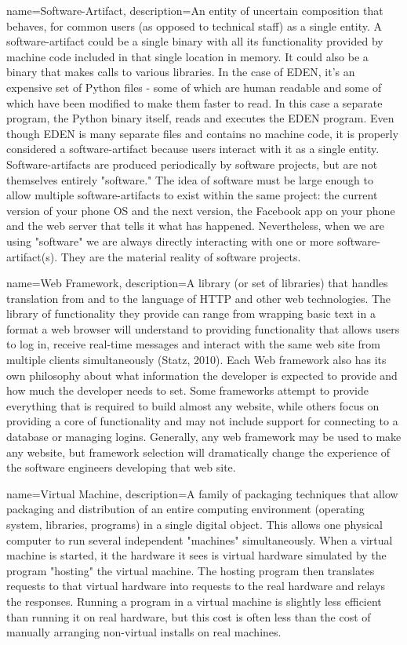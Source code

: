 {
    name=Software-Artifact,
    description={An entity of uncertain composition that behaves, for common users (as opposed to technical staff) as a single entity. A software-artifact could be a single binary with all its functionality provided by machine code included in that single location in memory. It could also be a binary that makes calls to various libraries. In the case of EDEN, it's an expensive set of Python files - some of which are human readable and some of which have been modified to make them faster to read. In this case a separate program, the Python binary itself, reads and executes the EDEN program. Even though EDEN is many separate files and contains no machine code, it is properly considered a software-artifact because users interact with it as a single entity.  Software-artifacts are produced periodically by software projects, but are not themselves entirely "software." The idea of software must be large enough to allow multiple software-artifacts to exist within the same project: the current version of your phone OS and the next version, the Facebook app on your phone and the web server that tells it what has happened. Nevertheless, when we are using "software" we are always directly interacting with one or more software-artifact(s). They are the material reality of software projects.}
}

{
  name=Web Framework,
  description={A library (or set of libraries) that handles translation from and to the language of HTTP and other web technologies. The library of functionality they provide can range from wrapping basic text in a format a web browser will understand to providing functionality that allows users to log in, receive real-time messages and interact with the same web site from multiple clients simultaneously (Statz, 2010). Each Web framework also has its own philosophy about what information the developer is expected to provide and how much the developer needs to set. Some frameworks attempt to provide everything that is required to build almost any website, while others focus on providing a core of functionality and may not include support for connecting to a database or managing logins. Generally, any web framework may be used to make any website, but framework selection will dramatically change the experience of the software engineers developing that web site.}
}

{
  name=Virtual Machine,
  description={A family of packaging techniques that allow packaging and distribution of an entire computing environment (operating system, libraries, programs) in a single digital object. This allows one physical computer to run several independent "machines" simultaneously. When a virtual machine is started, it the hardware it sees is virtual hardware simulated by the program "hosting" the virtual machine. The hosting program then translates requests to that virtual hardware into requests to the real hardware and relays the responses. Running a program in a virtual machine is slightly less efficient than running it on real hardware, but this cost is often less than the cost of manually arranging non-virtual installs on real machines.}
}


